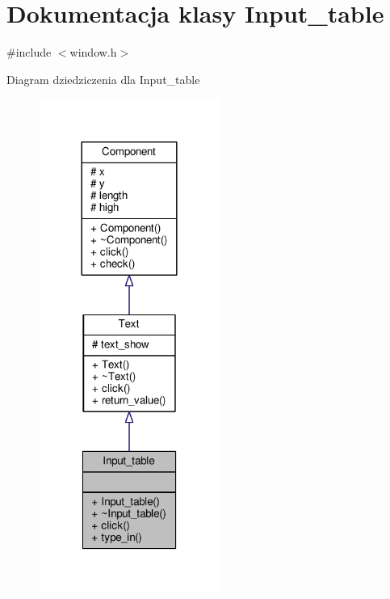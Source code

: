 \hypertarget{classInput__table}{}\section{Dokumentacja klasy Input\+\_\+table}
\label{classInput__table}


{\ttfamily \#include $<$window.\+h$>$}



Diagram dziedziczenia dla Input\+\_\+table\nopagebreak
\begin{figure}[H]
\begin{center}
\leavevmode
\includegraphics[width=168pt]{classInput__table__inherit__graph}
\end{center}
\end{figure}


